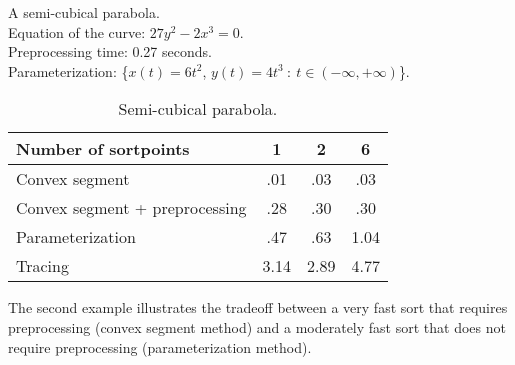 \begin{example}
{\samepage
A semi-cubical parabola.\\
\indent Equation of the curve: $27 y^{2} - 2x^{3} = 0$.\\
\indent Preprocessing time: 0.27 seconds.\\
\indent Parameterization: \{$x(t) = 6t^{2}$, $y(t) = 4t^{3}\ :\ 
t \in (-\infty, +\infty)$\}.

}
\begin{table}[h]
\caption{Semi-cubical parabola.}
\begin{center}
\begin{tabular}{|l|c|c|c|}
\hline
Number of sortpoints & 1 & 2 & 6 \\ \hline \hline
Convex segment &           .01 & .03 & .03 \\ \hline
Convex segment + preprocessing & .28 & .30 & .30 \\ \hline
Parameterization & .47 & .63 & 1.04 \\ \hline
Tracing         & 3.14 & 2.89 & 4.77 \\ \hline
\end{tabular}
\end{center}
\end{table}
\end{example}

The second example illustrates the tradeoff between a very fast sort 
that requires preprocessing (convex segment method) and a moderately fast 
sort that does not require preprocessing (parameterization method).

\vspace{.2in}

